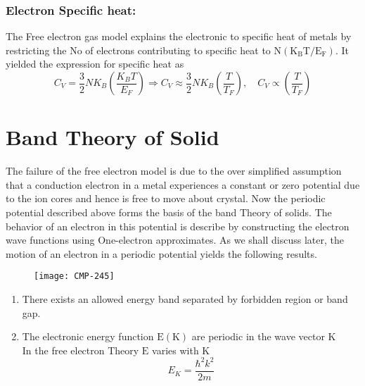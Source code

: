 \subsubsection{Electron Specific heat:}
The Free electron gas model explains the electronic to specific heat of metals by restricting the No of electrons contributing to specific heat to $\mathrm{N}\left(\mathrm{K}_{\mathrm{B}} \mathrm{T} / \mathrm{E}_{\mathrm{F}}\right)$. It yielded the expression for specific heat as
$$C_{V}=\frac{3}{2} N K_{B}\left(\frac{K_{B} T}{E_{F}}\right) \Rightarrow C_{V} \approx \frac{3}{2} N K_{B}\left(\frac{T}{T_{F}}\right), \quad C_{V} \propto\left(\frac{T}{T_{F}}\right)$$
\section{Band Theory of Solid}
The failure of the free electron model is due to the over simplified assumption that a conduction electron in a metal experiences a constant or zero potential due to the ion cores and hence is free to move about crystal. Now the periodic potential described above forms the basis of the band Theory of solids. The behavior of an electron in this potential is describe by constructing the electron wave functions using One-electron approximates. As we shall discuss later, the motion of an electron in a periodic potential yields the following results.
\begin{figure}[H]
	\centering
	\texttt{[image: CMP-245]}
	\caption{}
	\label{}
\end{figure}
\begin{enumerate}[label=\alph*)]
	\item There exists an allowed energy band separated by forbidden region or band gap.
	\item  The electronic energy function $\mathrm{E}(\mathrm{K})$ are periodic in the wave vector $\mathrm{K}$\\
	In the free electron Theory $\mathrm{E}$ varies with $\mathrm{K}$
	$$
	E_{K}=\frac{\hbar^{2} k^{2}}{2 m}
	$$
\end{enumerate}
